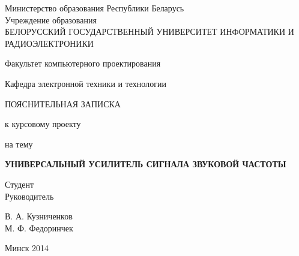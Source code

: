 \thispagestyle{empty}

\begin{center}
Министерство образования Республики Беларусь\\
\vspace{1em}
Учреждение образования\\
{\Largev БЕЛОРУССКИЙ ГОСУДАРСТВЕННЫЙ УНИВЕРСИТЕТ ИНФОРМАТИКИ И РАДИОЭЛЕКТРОНИКИ}
\end{center} 
\vspace{1em}
\noindent
Факультет компьютерного проектирования
\par \vspace{1em}
\noindent
Кафедра электронной техники и технологии
\par
\vspace{6em}
\begin{center}
{\Largev ПОЯСНИТЕЛЬНАЯ ЗАПИСКА} \par к курсовому проекту 
\par 
на тему 
\par \vspace{1em}
\textbf{\Largev УНИВЕРСАЛЬНЫЙ УСИЛИТЕЛЬ СИГНАЛА ЗВУКОВОЙ ЧАСТОТЫ}
\end{center}

\vspace{6em}

\begin{minipage}{0.5\textwidth}
\begin{flushleft}
Студент \\
Руководитель\\
\end{flushleft}
\end{minipage}
\begin{minipage}{0.4\textwidth}
\begin{flushright}
\begin{minipage}{0.65\textwidth}
\begin{flushleft}
В. А. Кузниченков\\
М. Ф. Федоринчек\\
\end{flushleft}
\end{minipage}
\end{flushright}
\end{minipage}


\vspace{12em}
\begin{center}
{Минск 2014}
\end{center}

\newpage

